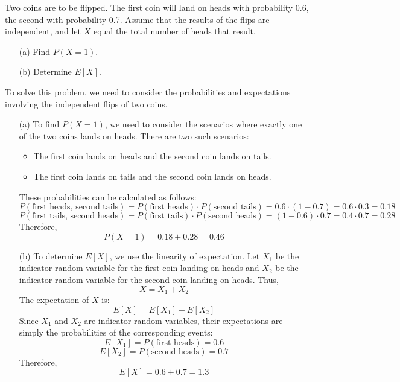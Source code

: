 \begin{exercise}
Two coins are to be flipped. The first coin will land on heads with probability 0.6, the second with probability 0.7. Assume that the results of the flips are independent, and let \(X\) equal the total number of heads that result.
\begin{enumerate}
    \item[(a)] Find \(P(X = 1)\).
    \item[(b)] Determine \(E[X]\).
\end{enumerate}
\end{exercise}

\begin{solution}
To solve this problem, we need to consider the probabilities and expectations involving the independent flips of two coins.

\begin{enumerate}
    \item[(a)] To find \(P(X = 1)\), we need to consider the scenarios where exactly one of the two coins lands on heads. There are two such scenarios:
    \begin{itemize}
        \item The first coin lands on heads and the second coin lands on tails.
        \item The first coin lands on tails and the second coin lands on heads.
    \end{itemize}
    These probabilities can be calculated as follows:
    \[
    P(\text{first heads, second tails}) = P(\text{first heads}) \cdot P(\text{second tails}) = 0.6 \cdot (1 - 0.7) = 0.6 \cdot 0.3 = 0.18
    \]
    \[
    P(\text{first tails, second heads}) = P(\text{first tails}) \cdot P(\text{second heads}) = (1 - 0.6) \cdot 0.7 = 0.4 \cdot 0.7 = 0.28
    \]
    Therefore,
    \[
    P(X = 1) = 0.18 + 0.28 = 0.46
    \]

    \item[(b)] To determine \(E[X]\), we use the linearity of expectation. Let \(X_1\) be the indicator random variable for the first coin landing on heads and \(X_2\) be the indicator random variable for the second coin landing on heads. Thus,
    \[
    X = X_1 + X_2
    \]
    The expectation of \(X\) is:
    \[
    E[X] = E[X_1] + E[X_2]
    \]
    Since \(X_1\) and \(X_2\) are indicator random variables, their expectations are simply the probabilities of the corresponding events:
    \[
    E[X_1] = P(\text{first heads}) = 0.6
    \]
    \[
    E[X_2] = P(\text{second heads}) = 0.7
    \]
    Therefore,
    \[
    E[X] = 0.6 + 0.7 = 1.3
    \]
\end{enumerate}

\end{solution}

